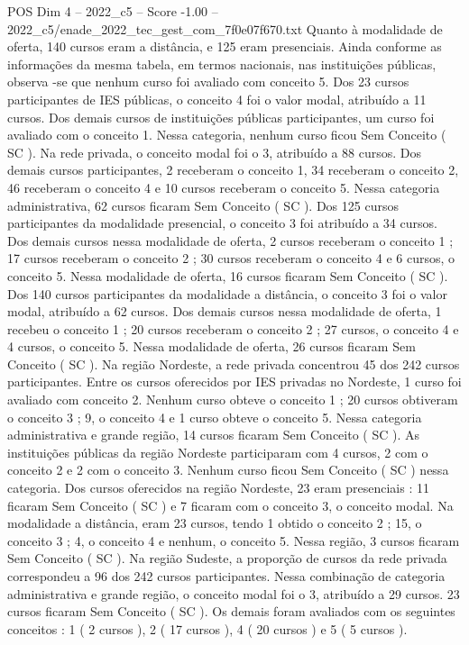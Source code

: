 \begin{textsample}{POS Dim 4 – 2022\_c5 – Score -1.00 – 2022\_c5/enade\_2022\_tec\_gest\_com\_7f0e07f670.txt}
Quanto à modalidade de oferta, 140 cursos eram a distância, e 125 eram presenciais.
Ainda conforme as informações da mesma tabela, em termos nacionais, nas instituições públicas, observa -se que nenhum curso foi avaliado com conceito 5.
Dos 23 cursos participantes de IES públicas, o conceito 4 foi o valor modal, atribuído a 11 cursos.
Dos demais cursos de instituições públicas participantes, um curso foi avaliado com o conceito 1.
Nessa categoria, nenhum curso ficou Sem Conceito ( SC ).
Na rede privada, o conceito modal foi o 3, atribuído a 88 cursos.
Dos demais cursos participantes, 2 receberam o conceito 1, 34 receberam o conceito 2, 46 receberam o conceito 4 e 10 cursos receberam o conceito 5.
Nessa categoria administrativa, 62 cursos ficaram Sem Conceito ( SC ).
Dos 125 cursos participantes da modalidade presencial, o conceito 3 foi atribuído a 34 cursos.
Dos demais cursos nessa modalidade de oferta, 2 cursos receberam o conceito 1 ; 17 cursos receberam o conceito 2 ; 30 cursos receberam o conceito 4 e 6 cursos, o conceito 5.
Nessa modalidade de oferta, 16 cursos ficaram Sem Conceito ( SC ).
Dos 140 cursos participantes da modalidade a distância, o conceito 3 foi o valor modal, atribuído a 62 cursos.
Dos demais cursos nessa modalidade de oferta, 1 recebeu o conceito 1 ; 20 cursos receberam o conceito 2 ; 27 cursos, o conceito 4 e 4 cursos, o conceito 5.
Nessa modalidade de oferta, 26 cursos ficaram Sem Conceito ( SC ).
Na região Nordeste, a rede privada concentrou 45 dos 242 cursos participantes.
Entre os cursos oferecidos por IES privadas no Nordeste, 1 curso foi avaliado com conceito 2.
Nenhum curso obteve o conceito 1 ; 20 cursos obtiveram o conceito 3 ; 9, o conceito 4 e 1 curso obteve o conceito 5.
Nessa categoria administrativa e grande região, 14 cursos ficaram Sem Conceito ( SC ).
As instituições públicas da região Nordeste participaram com 4 cursos, 2 com o conceito 2 e 2 com o conceito 3.
Nenhum curso ficou Sem Conceito ( SC ) nessa categoria.
Dos cursos oferecidos na região Nordeste, 23 eram presenciais : 11 ficaram Sem Conceito ( SC ) e 7 ficaram com o conceito 3, o conceito modal.
Na modalidade a distância, eram 23 cursos, tendo 1 obtido o conceito 2 ; 15, o conceito 3 ; 4, o conceito 4 e nenhum, o conceito 5.
Nessa região, 3 cursos ficaram Sem Conceito ( SC ).
Na região Sudeste, a proporção de cursos da rede privada correspondeu a 96 dos 242 cursos participantes.
Nessa combinação de categoria administrativa e grande região, o conceito modal foi o 3, atribuído a 29 cursos. 23 cursos ficaram Sem Conceito ( SC ).
Os demais foram avaliados com os seguintes conceitos : 1 ( 2 cursos ), 2 ( 17 cursos ), 4 ( 20 cursos ) e 5 ( 5 cursos ).

\end{textsample}

